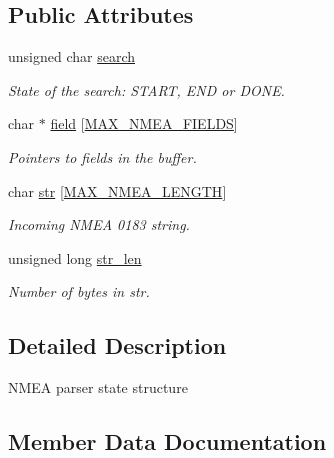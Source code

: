 \subsection*{Public Attributes}
\begin{DoxyCompactItemize}
\item 
unsigned char \mbox{\hyperlink{structnmea__state_af328f20b3659e91c66c79d832680dec6}{search}}
\begin{DoxyCompactList}\small\item\em State of the search\+: S\+T\+A\+RT, E\+ND or D\+O\+NE. \end{DoxyCompactList}\item 
char $\ast$ \mbox{\hyperlink{structnmea__state_a72aed21ebed1896b54b1a97f47262c1d}{field}} \mbox{[}\mbox{\hyperlink{nmea_8h_a3e71b1d0a33b70921fc460b33bbf068d}{M\+A\+X\+\_\+\+N\+M\+E\+A\+\_\+\+F\+I\+E\+L\+DS}}\mbox{]}
\begin{DoxyCompactList}\small\item\em Pointers to fields in the buffer. \end{DoxyCompactList}\item 
char \mbox{\hyperlink{structnmea__state_a6ec31934d18620490b027e544c574f6b}{str}} \mbox{[}\mbox{\hyperlink{nmea_8h_a1266d7c7847e5fce687eafaee2f46262}{M\+A\+X\+\_\+\+N\+M\+E\+A\+\_\+\+L\+E\+N\+G\+TH}}\mbox{]}
\begin{DoxyCompactList}\small\item\em Incoming N\+M\+EA 0183 string. \end{DoxyCompactList}\item 
unsigned long \mbox{\hyperlink{structnmea__state_a7e40c5b90eb5a0c69d13a80878478904}{str\+\_\+len}}
\begin{DoxyCompactList}\small\item\em Number of bytes in str. \end{DoxyCompactList}\end{DoxyCompactItemize}


\subsection{Detailed Description}
N\+M\+EA parser state structure 

\subsection{Member Data Documentation}
\mbox{\label{structnmea__state_a72aed21ebed1896b54b1a97f47262c1d}} 
